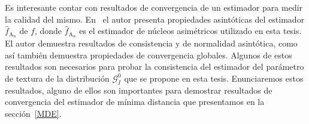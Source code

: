 Es interesante contar con resultados de convergencia de un estimador para medir la calidad del mismo. En~\cite{Libnegue2013} el autor presenta propiedades asintóticas del estimador $\widehat{f}_{\text{A}_n}$ de $f$, donde $\widehat{f}_{\text{A}_n}$ es el estimador de núcleos asimétricos utilizado en esta tesis. El autor demuestra resultados de consistencia y de normalidad asintótica, como así también demuestra propiedades de convergencia globales. Algunos de estos resultados son necesarios para probar la consistencia del estimador del parámetro de textura de la distribución $\mathcal{G}_I^0$ que se propone en esta tesis. Enunciaremos estos resultados, alguno de ellos son importantes para demostrar resultados de convergencia del estimador de mínima distancia que presentamos en la sección~\ref{MDE}.

%
%

